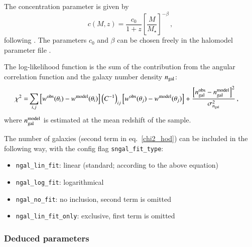 \documentclass[11pt, chapterprefix, headsepline]{scrartcl}
\begin{document}
The concentration parameter is given by
%
\begin{equation}
  c(M,z) = \frac{c_0}{1+z} \left [ \frac{M}{M_{\star}} \right
  ]^{-\beta} \, ,
\end{equation}
%
following \citet{2003MNRAS.340..580T}. The parameters $c_0$ and
$\beta$ can be chosen freely in the halomodel parameter file .



The log-likelihood function is the sum of the contribution from the 
angular correlation function and the galaxy number density $n_{\rm
  gal}$:
%
\begin{align}
  \chi^2 = & \sum_{i,j}\left[w^{\rm obs}(\theta_{i}) -
    w^{\rm model}(\theta_{i})\right]\left(C^{-1}\right)_{ij}\left[w^{\rm obs}(\theta_{j}) -
    w^{\rm model}(\theta_{j})\right]
  + \frac{\left[n_{\rm gal}^{\rm obs} - n_{\rm gal}^{\rm
      model}\right]^2}{\sigma^2_{n_{\rm gal}}} \, ,
\label{chi2_hod}
\end{align}
%
where $n_{\rm gal}^{\rm model}$ is estimated at the
mean redshift of the sample.

The number of galaxies (second term in eq.~\ref{chi2_hod}) can be
included in the following way, with the config flag \texttt{sngal\_fit\_type}:

\begin{itemize}

\item \texttt{ngal\_lin\_fit}: linear (standard; according to the above equation)

\item \texttt{ngal\_log\_fit}: logarithmical

\item \texttt{ngal\_no\_fit}: no inclusion, second term is omitted

\item \texttt{ngal\_lin\_fit\_only}: exclusive, first term is omitted

\end{itemize}



\subsubsection{Deduced parameters}
\end{document}
